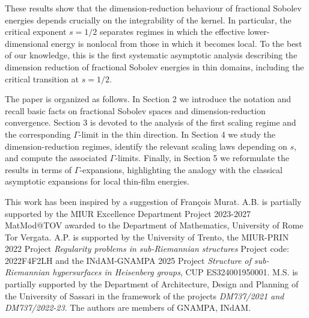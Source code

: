 \documentclass[11pt]{article}
\begin{document}
\smallskip
These results show that the dimension-reduction behaviour of fractional Sobolev
energies depends crucially on the integrability of the kernel. In particular, the critical exponent $s=1/2$ separates regimes in which the effective lower-dimensional energy is nonlocal from those in which it becomes local. To the best of our knowledge, this is the first systematic asymptotic analysis describing the dimension reduction of fractional Sobolev energies in thin domains, including the critical transition at $s=1/2$.

\bigskip
The paper is organized as follows. In Section 2 we introduce the notation and recall basic facts on fractional Sobolev spaces and dimension-reduction convergence. Section 3 is devoted to the analysis of the first scaling regime and the corresponding $\Gamma$-limit in
the thin direction. In Section 4 we study the dimension-reduction regimes, identify the relevant scaling laws depending on $s$, and compute the associated $\Gamma$-limits. Finally, in Section 5 we reformulate the results in terms of $\Gamma$-expansions, highlighting the analogy with the classical asymptotic expansions for local thin-film energies.

\bigskip
{} 
This work has been inspired by a suggestion of Fran\c cois Murat.  A.B. is partially supported by the MIUR Excellence Department Project 2023-2027 MatMod@TOV awarded to the Department of Mathematics, University of Rome Tor Vergata. A.P. is supported by the University of Trento, the MIUR-PRIN 2022 Project \emph{Regularity problems in sub-Riemannian structures}  Project code: 2022F4F2LH and the INdAM-GNAMPA 2025 Project \emph{Structure of sub-Riemannian hypersurfaces in Heisenberg groups}, CUP ES324001950001. M.S. is partially supported by the Department of Architecture, Design and Planning of the University of Sassari in the framework of the projects {\em DM737/2021 and DM737/2022-23}. 
The authors are members of GNAMPA, INdAM.
\end{document}

